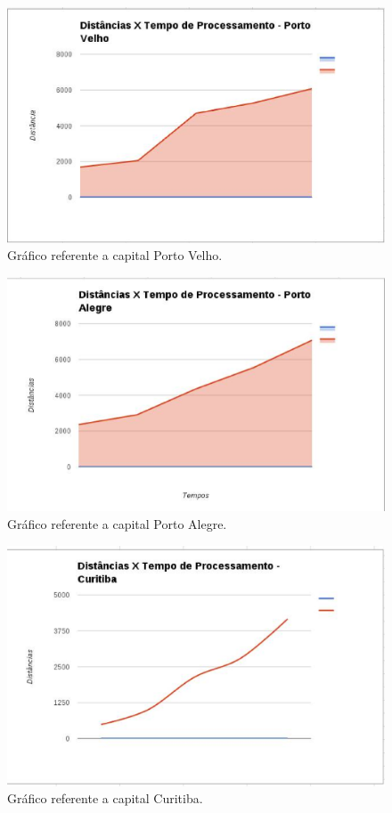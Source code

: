 \begin{figure}[!htb]
 \centering
 \includegraphics[scale= 0.3]{figuras/imagem1.eps}
 \caption{Gráfico referente a capital Porto Velho.}
\end{figure}

\begin{figure}[!htb]
 \centering
 \includegraphics[scale= 0.3]{figuras/imagem2.eps}
 \caption{Gráfico referente a capital Porto Alegre.}
\end{figure}

\begin{figure}[!htb]
 \centering
 \includegraphics[scale= 0.3]{figuras/imagem3.eps}
 \caption{Gráfico referente a capital Curitiba.}
\end{figure}

